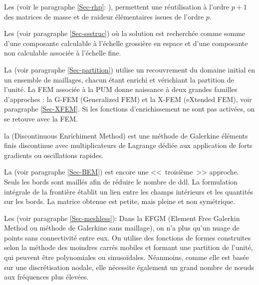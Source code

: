 \medskip 
Les  
(voir le paragraphe \ref{Sec-rhp}:
), permettent une réutilisation à l'ordre $p+1$ des matrices 
de masse et de raideur élémentaires issues de l'ordre $p$.

Les  (voir paragraphe \ref{Sec-ssstruc}) où la solution est 
recherchée comme somme d'une composante calculable à l'échelle grossière en espace et 
d'une composante non calculable associée à l'échelle fine.

La  (voir paragraphe \ref{Sec-partition}) utilise un recouvrement 
du domaine initial en un ensemble  de maillages, chacun étant enrichi et vérichiant la partition de l'unité.
La FEM associée à la PUM donne naissance à deux grandes familles d'approches :
la G-FEM (Generalized FEM) et la X-FEM (eXtended FEM), 
voir paragraphe \ref{Sec-XFEM}.
Si les fonctions d'enrichissement ne sont pas activées, on se retouve avec la FEM.

la  
(Discontinuous Enrichiment Method) est une méthode de Galerkine éléments finis
discontinue avec multiplicateurs de Lagrange 
dédiée aux application de forts gradients ou oscillations rapides.

\bigskip
La  
(voir paragraphe \ref{Sec-BEM}) est encore une <<~troisième~>> approche.
Seuls les bords sont maillés afin de réduire le nombre de ddl.
La formulation intégrale de la frontière établit un lien entre les champs intérieurs
et les quantités sur les bords.
La matrice obtenue est petite, mais pleine et non symétrique.

\bigskip
Les  (voir paragraphe \ref{Sec-meshless}):
Dans la EFGM (Element Free Galerkin Method ou méthode de Galerkine sans maillage), 
on n'a plus qu'un nuage de points sans connectivité entre eux.
On utilise des fonctions de formes construites selon la méthode des moindres carrés mobiles et
formant une partition de l'unité, qui peuvent être polynomiales 
ou sinusoïdales.
Néanmoins, comme elle est basée sur une discrétisation nodale, elle nécessite également
un grand nombre de nœuds aux fréquences plus élevées.

